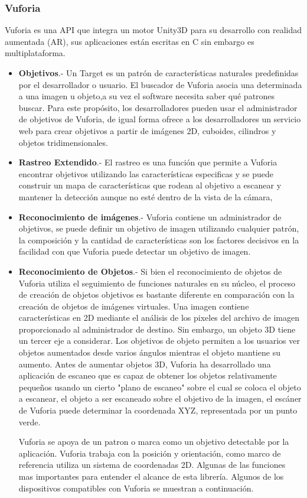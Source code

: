 \subsubsection{Vuforia}
Vuforia es una API que integra un motor Unity3D para su desarrollo con realidad aumentada (AR), sus aplicaciones están escritas en C sin embargo es multiplataforma.\par
	\begin{itemize}
	
	\item \textbf{Objetivos}.- Un Target es un patrón de características naturales predefinidas por el desarrollador o usuario. El buscador de  Vuforia asocia una determinada a una imagen u objeto,a  su vez el software necesita saber qué patrones buscar. Para este propósito, los desarrolladores pueden usar el administrador de objetivos de Vuforia, de igual forma ofrece a los desarrolladores un servicio web para crear objetivos a partir de imágenes 2D, cuboides, cilindros y objetos tridimensionales.
	
	\item \textbf{Rastreo Extendido}.- El rastreo es una función que permite a Vuforia encontrar objetivos utilizando las características especificas y se  puede construir un mapa de características que rodean al objetivo a escanear y mantener la detección aunque no esté dentro de la vista de la cámara, 
	
	\item \textbf{Reconocimiento de imágenes}.- Vuforia contiene un administrador de objetivos, se puede definir un objetivo de imagen utilizando cualquier patrón, la composición y la cantidad de características son los factores decisivos en la facilidad con que Vuforia puede detectar un objetivo de imagen.
	
	\item \textbf{Reconocimiento de Objetos}.- Si bien el reconocimiento de objetos de Vuforia utiliza el seguimiento de funciones naturales en su núcleo, el proceso de creación de objetos objetivos es bastante diferente en comparación con la creación de objetos de imágenes virtuales. Una imagen contiene características en 2D mediante el análisis de los pixeles del archivo de imagen proporcionado al administrador de destino. Sin embargo, un objeto 3D tiene un tercer eje a considerar. Los objetivos de objeto permiten a los usuarios ver objetos aumentados desde varios ángulos mientras el objeto mantiene su aumento. Antes de aumentar objetos 3D, Vuforia ha desarrollado una aplicación de escaneo que es capaz de obtener los objetos relativamente pequeños usando un cierto "plano de escaneo" sobre el cual se coloca el objeto a escanear, el objeto a ser escaneado sobre el objetivo de la imagen, el escáner de Vuforia puede determinar la coordenada XYZ, representada por un punto verde.\par
	Vuforia se apoya de un patron o marca como un objetivo detectable por la aplicación. Vuforia trabaja con la posición y orientación, como marco de referencia utiliza un sistema de coordenadas 2D. Algunas de las funciones mas importantes para entender el alcance de esta librería. \cite{B12}
	Algunos de los dispositivos compatibles con Vuforia se muestran a continuación.
\end{itemize}
